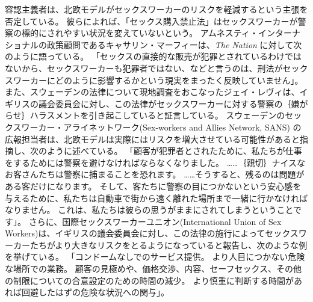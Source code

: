 \documentclass[paper=a4,book,openany]{jlreq}
\begin{document}
容認主義者は、北欧モデルがセックスワーカーのリスクを軽減するという主張を否定している。
彼らによれば、「セックス購入禁止法」はセックスワーカーが警察の標的にされやすい状況を変えていないという。
アムネスティ・インターナショナルの政策顧問であるキャサリン・マーフィーは、\emph{The Nation} に対して次のように語っている。
「セックスの直接的な販売が犯罪とされているわけではないから、セックスワーカーも犯罪者ではない、などと言うのは、刑法がセックスワーカーにどのように影響するかという現実をまったく反映していません」\citep{grant16:_amnes_inter_calls_end_nordic}。
また、スウェーデンの法律について現地調査をおこなったジェイ・レヴィは、イギリスの議会委員会に対し、この法律がセックスワーカーに対する警察の｛嫌がらせ｝{ハラスメント}を引き起こしていると証言している。
スウェーデンのセックスワーカー・アライネットワーク(Sex-workers and Allies Network, SANS) の広報担当者は、北欧モデルは実際にはリスクを増大させている可能性があると指摘し、次のように述べている。
「顧客が犯罪者とされたために、私たちが仕事をするためには警察を避けなければならなくなりました。
……｛親切｝{ナイス}なお客さんたちは警察に捕まることを恐れます。
……そうすると、残るのは問題がある客だけになります。
そして、客たちに警察の目につかないという安心感を与えるために、私たちは自動車で街から遠く離れた場所まで一緒に行かなければなりません。
これは、私たちは彼らの思うがままにされてしまうということです」\citep{savage08:_swedis_prost}。
さらに、国際セックスワーカーユニオン(International Union of Sex Workers)は、イギリスの議会委員会に対し、この法律の施行によってセックスワーカーたちがより大きなリスクをとるようになっていると報告し、次のような例を挙げている。
「コンドームなしでのサービス提供。
より人目につかない危険な場所での業務。
顧客の見極めや、価格交渉、内容、セーフセックス、その他の制限についての合意設定のための時間の減少。
より慎重に判断する時間があれば回避したはずの危険な状況への関与」\citep[p.26]{commons16:_prost}。
\end{document}
